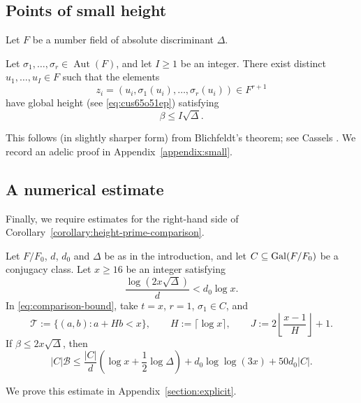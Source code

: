 \documentclass[reqno]{amsart} 
\begin{document}
\subsection{Points of small height}\label{section:small}

Let $F$ be a number field of absolute discriminant $\Delta$.

\begin{proposition}\label{prop:small-set}
  Let $\sigma_1,\dotsc,\sigma_r\in\operatorname{Aut}(F)$, and let $I\geq1$ be an integer.  There exist distinct $u_1,\dotsc,u_I\in F$ such that the elements
  \begin{equation*}
    z_i=(u_i,\sigma_1(u_i),\dotsc,\sigma_r(u_i)) \in F^{r + 1}
  \end{equation*}
  have global height (see \eqref{eq:cus65o51ep}) satisfying
  \begin{equation*}
    \beta\leq I\sqrt\Delta.
  \end{equation*}
\end{proposition}
This follows (in slightly sharper form) from Blichfeldt's theorem; see Cassels \cite[Chapter III, \S3, Theorem IV]{cassels-geometry-of-numbers}.  We record an adelic proof in Appendix~\ref{appendix:small}.

\subsection{A numerical estimate}\label{sec:cus71nhdho}

Finally, we require estimates for the right-hand side of Corollary~\ref{corollary:height-prime-comparison}.

\begin{lemma}\label{lemma:numerical-bound}
  Let $F/F_0$, $d$, $d_0$ and $\Delta$ be as in the introduction, and let $C\subseteq\operatorname{Gal}(F/F_0)$ be a conjugacy class.  Let $x\geq16$ be an integer satisfying
  \begin{equation*}
    \frac{\log(2x\sqrt\Delta)}{d}<d_0\log x.
  \end{equation*}
  In \eqref{eq:comparison-bound}, take $t=x$, $r=1$, $\sigma_1\in C$, and
  \begin{equation}\label{eq:cus65vhezd}
    \mathcal{T}:=\{(a,b):a+Hb<x\}, \qquad
    H:=\lceil\log x\rceil, \qquad
    J:=2\left\lfloor\frac{x-1}{H}\right\rfloor+1.
  \end{equation}
  If $\beta\leq2x\sqrt\Delta$, then
  \begin{equation*}
    |C|\mathcal{B}
    \leq \frac{|C|}{d}\left(\log x+\frac12\log\Delta\right)
    +d_0\log\log(3x)+50d_0|C|.
  \end{equation*}
\end{lemma}
We prove this estimate in Appendix~\ref{section:explicit}.
\end{document}
